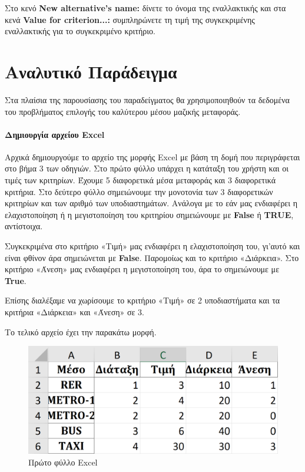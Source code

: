 \documentclass[11pt,a4paper,titlepage]{article}
\numberwithin{equation}{section}
\begin{document}
\begin{enumerate}
\begin{itemize}
		Στο κενό \textbf{New alternative's name:} δίνετε το όνομα της εναλλακτικής και στα κενά \textbf{Value for criterion...:} συμπληρώνετε τη τιμή της συγκεκριμένης εναλλακτικής για το συγκεκριμένο κριτήριο.	
	\end{itemize}
\end{enumerate}

\section{Αναλυτικό Παράδειγμα}
\label{sec:example}

Στα πλαίσια της παρουσίασης του παραδείγματος θα χρησιμοποιηθούν τα δεδομένα του προβλήματος επιλογής του καλύτερου μέσου μαζικής μεταφοράς.

\paragraph{Δημιουργία αρχείου Excel}
Αρχικά δημιουργούμε το αρχείο της μορφής Excel με βάση τη δομή που περιγράφεται στο βήμα 3 των οδηγιών. Στο πρώτο φύλλο υπάρχει η κατάταξη του χρήστη και οι τιμές των κριτηρίων. Έχουμε 5 διαφορετικά μέσα μεταφοράς και 3 διαφορετικά κριτήρια. Στο δεύτερο φύλλο σημειώνουμε την μονοτονία των 3 διαφορετικών κριτηρίων και των αριθμό των υποδιαστημάτων. Ανάλογα με το εάν μας ενδιαφέρει η ελαχιστοποίηση ή η μεγιστοποίηση του κριτηρίου σημειώνουμε με \textbf{False} ή \textbf{TRUE}, αντίστοιχα.

Συγκεκριμένα στο κριτήριο «Τιμή» μας ενδιαφέρει η ελαχιστοποίηση του, γι'αυτό και είναι φθίνον άρα σημειώνεται με \textbf{False}. Παρομοίως και το κριτήριο «Διάρκεια». Στο κριτήριο «Άνεση» μας ενδιαφέρει η μεγιστοποίηση του, άρα το σημειώνουμε με \textbf{True}. 

Επίσης διαλέξαμε να χωρίσουμε το κριτήριο «Τιμή» σε 2 υποδιαστήματα και τα κριτήρια «Διάρκεια» και «Άνεση» σε 3.

Το τελικό αρχείο έχει την παρακάτω μορφή.

\begin{figure}[H]
	\centering
	\includegraphics[width=0.7\linewidth]{media/excel_sheet_1.png}
	\caption{Πρώτο φύλλο Excel}
	\label{fig:excel_sheet_1}
\end{figure}
\end{document}
